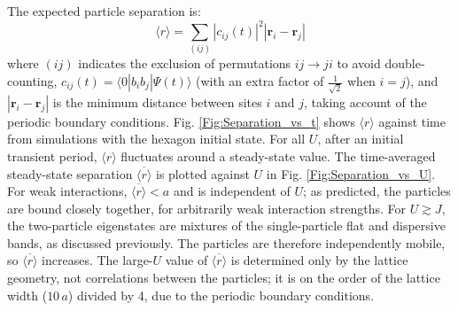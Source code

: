 The expected particle separation is:
\begin{equation}
    \langle r \rangle = \sum_{(ij)}|c_{ij}(t)|^2|\textbf{r}_i-\textbf{r}_j|
\end{equation}
where $(ij)$ indicates the exclusion of permutations $ij \rightarrow ji$ to avoid double-counting, $c_{ij}(t)=\langle 0|b_{i}b_{j}|\Psi(t)\rangle$ (with an extra factor of $\frac{1}{\sqrt{2}}$ when $i=j$), and $|\textbf{r}_i-\textbf{r}_j|$ is the minimum distance between sites $i$ and $j$, taking account of the periodic boundary conditions. Fig. \ref{Fig:Separation_vs_t} shows $\langle r \rangle$ against time from simulations with the hexagon initial state. For all $U$, after an initial transient period, $\langle r \rangle$ fluctuates around a steady-state value. The time-averaged steady-state separation $\overline{\langle r \rangle}$ is plotted against $U$ in Fig. \ref{Fig:Separation_vs_U}. For weak interactions, $\overline{\langle r \rangle}<a$ and is independent of $U$; as predicted, the particles are bound closely together, for arbitrarily weak interaction strengths. For $U\gtrsim J$, the two-particle eigenstates are mixtures of the single-particle flat and dispersive bands, as discussed previously. The particles are therefore independently mobile, so $\overline{\langle r \rangle}$ increases. The large-$U$ value of $\overline{\langle r \rangle}$ is determined only by the lattice geometry, not correlations between the particles; it is on the order of the lattice width ($10\,a$) divided by 4, due to the periodic boundary conditions.

\vspace{1cm}

